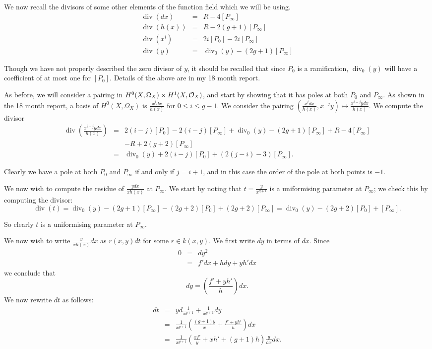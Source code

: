 \documentclass[draft, 11pt]{article} %
\theoremstyle{plain}
\theoremstyle{remark}
\newcommand{\cO}{{\cal O}}
\DeclareMathOperator{\di}{div}
\begin{document}
We now recall the divisors of some other elements of the function field which we will be using.
\begin{eqnarray*}
\di (dx) & = & R - 4[P_\infty] \\
\di (h(x)) & = & R - 2(g+1)[P_\infty] \\
\di (x^i) & = & 2i[P_0] - 2i[P_\infty]\\
\di (y) & = & \di_0(y) - (2g+1)[P_\infty]
\end{eqnarray*}

Though we have not properly described the zero divisor of $y$, it should be recalled that since $P_0$ is a ramification, $\di_0(y)$ will have a coefficient of at most one for $[P_0]$.
Details of the above are in my 18 month report.

As before, we will consider a pairing in $H^0(X,\Omega_X) \times H^1(X,\cO_X)$, and start by showing that it has poles at both $P_0$ and $P_\infty$.
As shown in the 18 month report, a basis of $H^0(X,\Omega_X)$ is $\frac{x^idx}{h(x)}$ for $0 \leq i \leq g-1$.
We consider the pairing $\left(\frac{x^idx}{h(x)}, x^{-j}y\right) \mapsto \frac{x^{i-j}ydx}{h(x)}$.
We compute the divisor
\begin{eqnarray*}
\di\left(\frac{x^{i-j}ydx}{h(x)}\right)  & = & 2(i-j)[P_0] - 2(i-j)[P_\infty] + \di_0(y) - (2g+1)[P_\infty] +R -4[P_\infty] \\
& & -R +2(g+2)[P_\infty] \\
& = &  \di_0(y) + 2(i-j)[P_0] +(2(j-i)-3)[P_\infty].
\end{eqnarray*}

Clearly we have a pole at both $P_0$ and $P_\infty$ if and only if $j=i+1$, and in this case the order of the pole at both points is $-1$.

We now wish to compute the residue of $\frac{ydx}{xh(x)}$ at $P_\infty$.
We start by noting that $t = \frac{y}{x^{g+1}}$ is a uniformising parameter at $P_\infty$; we check this by computing the divisor:
\[
\di(t) = \di_0(y) - (2g+1)[P_\infty] -(2g+2)[P_0] + (2g+2)[P_\infty] = \di_0(y)-(2g+2)[P_0] + [P_\infty].
\]

So clearly $t$ is a uniformising parameter at $P_\infty$.

We now wish to write $\frac{y}{xh(x)}dx$ as $r(x,y)dt$ for some $r \in k(x,y)$.
We first write $dy$ in terms of $dx$.
Since
\begin{eqnarray*}
0 & = & dy^2 \\
& = & f'dx + hdy + yh'dx
\end{eqnarray*}
we conclude that 
\[
dy = \left( \frac{f'+yh'}{h} \right) dx.
\]
We now rewrite $dt$ as follows:
\begin{eqnarray*}
dt & = & yd\frac{1}{x^{g+1}} + \frac{1}{x^{g+1}}dy \\
& = & \frac{1}{x^{g+1}} \left( \frac{(g+1)y}{x} + \frac{f'+yh'}{h} \right) dx \\
& = & \frac{1}{x^{g+1}} \left( \frac{xf'}{y} + xh' + (g+1)h \right) \frac{y}{hx} dx.
\end{eqnarray*}
\end{document}
